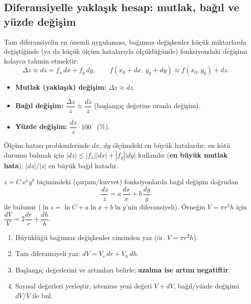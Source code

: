 \subsection{Diferansiyelle yaklaşık hesap: mutlak, bağıl ve yüzde değişim}

Tam diferansiyelin en önemli uygulaması, bağımsız değişkenler küçük miktarlarda değiştiğinde (ya da küçük ölçüm
hatalarıyla ölçüldüğünde) fonksiyondaki değişimi kolayca tahmin etmektir:
\[ \Delta z\approx dz=f_x\,dx+f_y\,dy,\qquad f(x_0+dx,\,y_0+dy)\approx f(x_0,y_0)+dz . \]

\begin{tanim}
\begin{itemize}
  \item \textbf{Mutlak (yaklaşık) değişim:} $\Delta z\approx dz$.
  \item \textbf{Bağıl değişim:} $\dfrac{\Delta z}{z}\approx\dfrac{dz}{z}$ (başlangıç değerine oranla değişim).
  \item \textbf{Yüzde değişim:} $\dfrac{dz}{z}\cdot100$ \ (\%).
\end{itemize}
Ölçüm hatası problemlerinde $dx$, $dy$ ölçümdeki en büyük hatalardır; en kötü durumu bulmak için
$|dz|\le|f_x||dx|+|f_y||dy|$ kullanılır (\textbf{en büyük mutlak hata}); $|dz|/|z|$ en büyük bağıl hatadır.
\end{tanim}

\begin{teorem}
$z=C\,x^a y^b$ biçimindeki (çarpım/kuvvet) fonksiyonlarda bağıl değişim doğrudan
\[ \frac{dz}{z}=a\,\frac{dx}{x}+b\,\frac{dy}{y} \]
ile bulunur ($\ln z=\ln C+a\ln x+b\ln y$'nin diferansiyeli). Örneğin $V=\pi r^2h$ için
$\dfrac{dV}{V}=2\dfrac{dr}{r}+\dfrac{dh}{h}$.
\end{teorem}

\begin{teorem}
\begin{enumerate}
  \item Büyüklüğü bağımsız değişkenler cinsinden yaz (ör. $V=\pi r^2h$).
  \item Tam diferansiyeli yaz: $dV=V_r\,dr+V_h\,dh$.
  \item Başlangıç değerlerini ve artımları belirle; \textbf{azalma ise artım negatiftir}.
  \item Sayısal değerleri yerleştir; istenirse yeni değeri $V+dV$, bağıl/yüzde değişimi $dV/V$ ile bul.
\end{enumerate}
\end{teorem}

